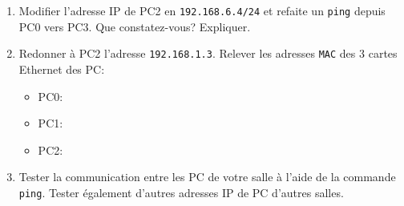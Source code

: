 \begin{exercice_cours}{}
\begin{enumerate}
        \begin{tcolorbox}[height = 3cm]
        
        \end{tcolorbox}

        \item Modifier l'adresse IP de PC2 en \verb+192.168.6.4/24+ et refaite un \verb+ping+ depuis PC0 vers PC3. Que constatez-vous? Expliquer.
       
        \begin{tcolorbox}[height = 3cm]
        
        \end{tcolorbox}

        \item Redonner à PC2 l'adresse \verb+192.168.1.3+. Relever les adresses \verb+MAC+ des 3 cartes Ethernet des PC:
        \begin{itemize}
            \item PC0: \dotfill
            \item PC1: \dotfill
            \item PC2: \dotfill
        \end{itemize}

        \item Tester la communication entre les PC de votre salle à l'aide de la commande \verb+ping+. Tester également d'autres adresses IP de PC d'autres salles.
        
    \end{enumerate}

\end{exercice_cours}

\medskip

